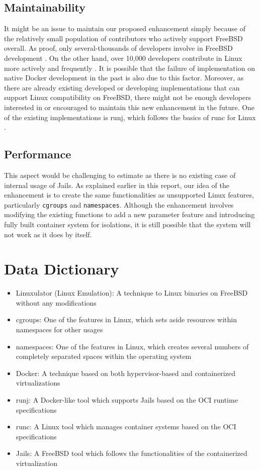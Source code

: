 \documentclass[12pt, dvipsnames, a4paper]{article}
\begin{document}
\subsection{Maintainability}
It might be an issue to maintain our proposed enhancement simply because of the relatively small population of contributors who actively support FreeBSD overall. As proof, only several-thousands of developers involve in FreeBSD development \cite{freebsd}. On the other hand, over 10,000 developers contribute in Linux more actively and frequently \cite{linux}. It is possible that the failure of implementation on native Docker development in the past is also due to this factor. Moreover, as there are already existing developed or developing implementations that can support Linux compatibility on FreeBSD, there might not be enough developers interested in or encouraged to maintain this new enhancement in the future. One of the existing implementations is runj, which follows the basics of runc for Linux \cite{runj}.

\subsection{Performance}
This aspect would be challenging to estimate as there is no existing case of internal usage of Jails. As explained earlier in this report, our idea of the enhancement is to create the same functionalities as unsupported Linux features, particularly \texttt{cgroups} and \texttt{namespaces}. Although the enhancement involves modifying the existing functions to add a new parameter feature and introducing fully built container system for isolations, it is still possible that the system will not work as it does by itself.

\section{Data Dictionary}
\begin{itemize}
	\item {Linuxulator (Linux Emulation): A technique to Linux binaries on FreeBSD without any modifications \cite{linuxulator}}
	\item {cgroups: One of the features in Linux, which sets aside resources within namespaces for other usages}
	\item {namespaces: One of the features in Linux, which creates several numbers of completely separated spaces within the operating system}
	\item {Docker: A technique based on both hypervisor-based and containerized virtualizations}
	\item {runj: A Docker-like tool which supports Jails based on the OCI runtime specifications}
	\item {runc: A Linux tool which manages container systems based on the OCI specifications}
	\item {Jails: A FreeBSD tool which follows the functionalities of the containerized virtualization}
\end{itemize}
\end{document}
